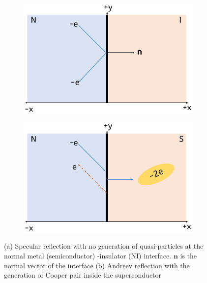\begin{figure}[h!]
    \centering
    \begin{subfigure}[b]{0.45\textwidth}
         \centering
         \includegraphics[trim={10cm 5.8cm 4.5cm 3.5cm},clip, width=1.5\linewidth]{Vec_Pic/AndreevReflectionNI.eps}
         \caption{}
         \label{TaNWonchip}
     \end{subfigure}
     \hfill
     \begin{subfigure}[b]{0.45\textwidth}
         \centering
         \includegraphics[trim={10cm 5.5cm 4cm 3.5cm},clip, width=1.5\linewidth]{Vec_Pic/AndreevReflection.eps}
         \caption{}
         \label{fig:three sin x}
     \end{subfigure}
    \caption{(a) Specular reflection with no generation of quasi-particles at the normal metal (semiconductor) -insulator (NI) interface. $\mathbf{n}$ is the normal vector of the interface (b) Andreev reflection with the generation of Cooper pair inside the superconductor}
    \label{AR}
\end{figure}

